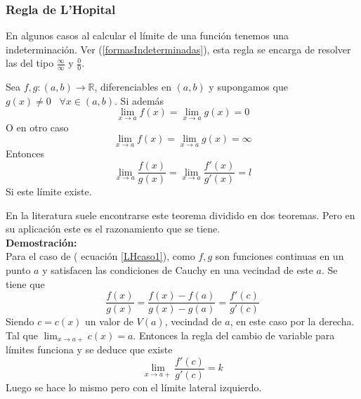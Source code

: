 \documentclass[10pt,twoside]{SelfArx} %
\begin{document}
  \subsubsection{Regla de L'Hopital}
   En algunos casos al calcular el límite de una función tenemos una indeterminación. Ver (\ref{formasIndeterminadas}), esta regla se encarga de resolver las del tipo $ \frac{\infty}{\infty} $ y   $ \frac{0}{0} $.
   \begin{teorema}
   	Sea $ f,g:(a,b)\rightarrow\mathbb{R} $, diferenciables en $ (a,b) $ y supongamos que $ g(x)\neq0\;\;\; \forall x\in(a,b) $. Si adem\'as
   	\begin{equation}
   	\lim_{x\rightarrow a}f(x)=\lim_{x\rightarrow a}g(x)=0
   	\end{equation}
   	O en otro caso
   	\begin{equation}
   	   	\lim_{x\rightarrow a}f(x)=\lim_{x\rightarrow a}g(x)=\infty\label{LHcaso1}
   	\end{equation}
   	Entonces 
   	\begin{equation}
   	   	\lim_{x\rightarrow a}\dfrac{f(x)}{g(x)}=\lim_{x\rightarrow a}\dfrac{f'(x)}{g'(x)}=l\label{LHcaso2}
   	\end{equation}
   	Si este l\'imite existe.
   \end{teorema}
   En la literatura suele encontrarse este teorema dividido en dos teoremas. Pero en su aplicaci\'on este es el razonamiento que se tiene.\\
   \textbf{Demostración:}\\
   Para el caso de ( ecuaci\'on \ref{LHcaso1}), como $ f,g $ son funciones continuas en un punto $ a $ y satisfacen las condiciones de Cauchy en una vecindad de este $ a $. Se tiene que 
   \begin{equation}
   \dfrac{f(x)}{g(x)}=  \dfrac{f(x)-f(a)}{g(x)-g(a)}=  \dfrac{f'(c)}{g'(c)}
   \end{equation}
   Siendo $ c=c(x) $ un valor de $ V(a) $, vecindad de $ a $, en este caso por la derecha. Tal que $ \displaystyle\lim_{x\rightarrow a+}c(x)=a $. Entonces la regla del cambio de variable para l\'imites funciona y se deduce que existe
   \begin{equation}
   \lim\limits_{x\rightarrow a+}\dfrac{f'(c)}{g'(c)}=k
   \end{equation}
   Luego se hace lo mismo pero con el l\'imite lateral izquierdo.
   \\
\end{document}
